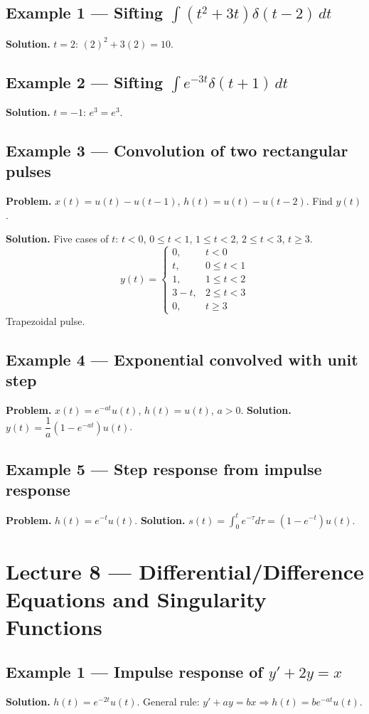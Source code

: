 \documentclass[11pt]{article}
\begin{document}
\subsection{Example 1 --- Sifting $\int(t^2+3t)\delta(t-2)\,dt$}
\textbf{Solution.} $t=2$: $(2)^2+3(2)=\boxed{10}$.

\subsection{Example 2 --- Sifting $\int e^{-3t}\delta(t+1)\,dt$}
\textbf{Solution.} $t=-1$: $e^{3}=\boxed{e^3}$.

\subsection{Example 3 --- Convolution of two rectangular pulses}
\textbf{Problem.} $x(t)=u(t)-u(t-1)$, $h(t)=u(t)-u(t-2)$. Find $y(t)$.

\textbf{Solution.} Five cases of $t$: $t<0$, $0\le t<1$, $1\le t<2$, $2\le t<3$, $t\ge 3$.
\[y(t)=\begin{cases}0,&t<0\\ t,&0\le t<1\\ 1,&1\le t<2\\ 3-t,&2\le t<3\\ 0,&t\ge 3\end{cases}\]
Trapezoidal pulse.

\subsection{Example 4 --- Exponential convolved with unit step}
\textbf{Problem.} $x(t)=e^{-at}u(t)$, $h(t)=u(t)$, $a>0$.
\textbf{Solution.} $y(t)=\dfrac{1}{a}(1-e^{-at})u(t)$.

\subsection{Example 5 --- Step response from impulse response}
\textbf{Problem.} $h(t)=e^{-t}u(t)$.
\textbf{Solution.} $s(t)=\int_0^t e^{-\tau}d\tau=(1-e^{-t})u(t)$.

\section{Lecture 8 --- Differential/Difference Equations and Singularity Functions}

\subsection{Example 1 --- Impulse response of $y'+2y=x$}
\textbf{Solution.} $h(t)=e^{-2t}u(t)$. General rule: $y'+ay=bx\Rightarrow h(t)=be^{-at}u(t)$.
\end{document}

